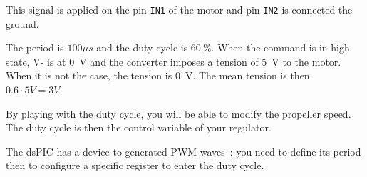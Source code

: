 \documentclass[11pt,a4paper]{article}
\theoremstyle{definition}%
\begin{document}
This signal is applied on the pin \texttt{IN1} of the motor and pin \texttt{IN2} is connected the ground.

The period is $100 \mu s$ and the duty cycle is $60~\%$.
When the command is in high state, V- is at 0~V and the converter imposes a tension of 5~V to the motor.
When it is not the case, the tension is 0~V.
The mean tension is then $0.6 \cdot 5V  = 3 V$.

\begin{framed}
By playing with the duty cycle, you will be able to modify the propeller speed.
The duty cycle is then the control variable of your regulator.
\end{framed}

The dsPIC has a device to generated PWM waves~: you need to define its period then to configure a specific register to enter the duty cycle.
\end{document}
